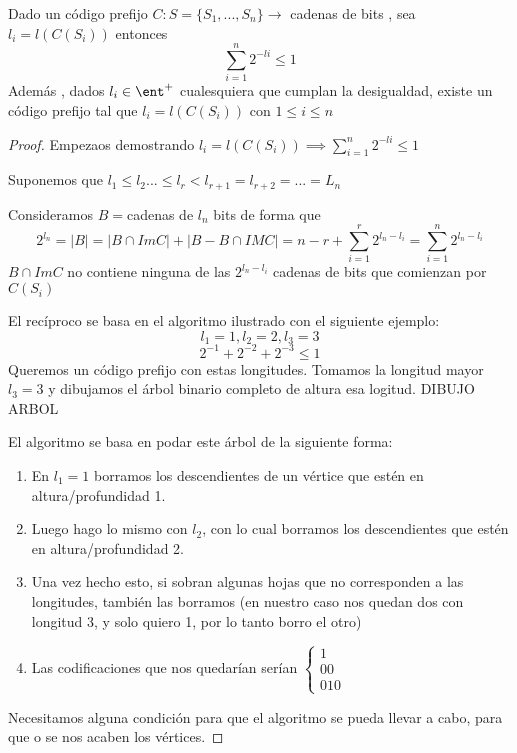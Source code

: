 \begin{theorem}
	Dado un código prefijo $C : S = \{S_1, ..., S_n\} \rightarrow $ {cadenas de bits} , sea $l_i = l (C(S_i))$ entonces
	$$\sum_{i=1}^{n} 2 ^{-li} \leq 1$$
	Además , dados $l_i \in \ent^{+}$ cualesquiera que cumplan la desigualdad, existe un código prefijo tal que $l_i = l(C(S_i))$ con $1\leq i \leq n$
\end{theorem}
\begin{proof}
	Empezaos demostrando $l_i = l (C(S_i)) \implies
	\sum_{i=1}^{n} 2 ^{-li} \leq 1$
	
	Suponemos que $l_1 \leq l_2 ... \leq l_r < l_{r+1} = l_{r+2} = ... = L_n$
	
	Consideramos $B =${cadenas de $l_n$ bits} de forma que 
	$$2^{l_n} = |B| = |B \cap Im C| + |B - B \cap IM C| = n-r + \sum_{i=1}^{r} 2^{l_n - l_i} = \sum_{i=1}^{n} 2^{l_n - l_i}$$
	$B \cap Im C$ no contiene ninguna de las $2^{l_n - l_i}$ cadenas de bits que comienzan por $C(S_i)$
	
	El recíproco se basa en el algoritmo ilustrado con el siguiente ejemplo:
	$$l_1 = 1 , l_2=2, l_3=3$$
	$$2^{-1} + 2^{-2} + 2 ^{-3} \leq 1$$
	Queremos un código prefijo con estas longitudes.
	Tomamos la longitud mayor $l_3 = 3$ y dibujamos el árbol binario completo de altura esa logitud.
	DIBUJO ARBOL
	
	El algoritmo se basa en podar este árbol de la siguiente forma:
	\begin{enumerate}
		\item En $l_1 = 1$ borramos los descendientes de un vértice que estén en altura/profundidad 1.
		
		\item Luego hago lo mismo con $l_2$, con lo cual borramos los descendientes que estén en altura/profundidad 2.
		
		\item Una vez hecho esto, si sobran algunas hojas que no corresponden a las longitudes, también las borramos (en nuestro caso nos quedan dos con longitud 3, y solo quiero 1, por lo tanto borro el otro)
		
		\item Las codificaciones que nos quedarían serían $\begin{cases}
		1\\00\\010
		\end{cases}$
	\end{enumerate}
	Necesitamos alguna condición para que el algoritmo se pueda llevar a cabo, para que o se nos acaben los vértices.
	

\end{proof}
